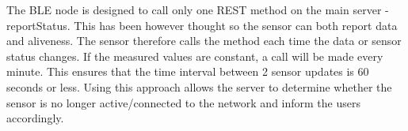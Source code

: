 The BLE node is designed to call only one REST method on the main server - reportStatus. This has been however thought so the sensor can both report data and aliveness. The sensor therefore calls the method each time the data or sensor status changes. If the measured values are constant, a call will be made every minute. This ensures that the time interval between 2 sensor updates is 60 seconds or less. Using this approach allows the server to determine whether the sensor is no longer active/connected to the network and inform the users accordingly. 



